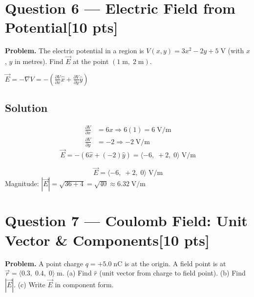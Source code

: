 \documentclass[12pt,letterpaper]{article}
\newcommand{\bvec}[1]{\langle #1 \rangle}   %
\newcommand{\units}[1]{\;\text{#1}}
\newcommand{\pts}[1]{\hfill\textcolor{TorontoBlue60}{[#1 pts]}}
\begin{document}
\newpage

\section{Question 6 --- Electric Field from Potential\pts{10}}
\label{sec:q6}

\textbf{Problem.} The electric potential in a region is
$V(x,y) = 3x^2 - 2y + 5\units{V}$ (with $x$, $y$ in metres).
Find $\vec{E}$ at the point $(1\units{m},\;2\units{m})$.

\begin{tcolorbox}[principbox]
$\vec{E} = -\nabla V = -\left(\frac{\partial V}{\partial x}\hat{x}
                              + \frac{\partial V}{\partial y}\hat{y}\right)$
\end{tcolorbox}

\subsection*{Solution}

\begin{align*}
  \frac{\partial V}{\partial x} &= 6x \Rightarrow 6(1) = 6\units{V/m} \\
  \frac{\partial V}{\partial y} &= -2  \Rightarrow -2\units{V/m}
\end{align*}
\[
  \vec{E} = -(6\hat{x} + (-2)\hat{y}) = \bvec{-6,\;+2,\;0}\units{V/m}
\]

\begin{tcolorbox}[answerbox]
\[
  \boxed{\vec{E} = \bvec{-6,\;+2,\;0}\units{V/m}}
\]
Magnitude: $|\vec{E}| = \sqrt{36+4} = \sqrt{40} \approx 6.32\units{V/m}$
\end{tcolorbox}

\newpage

\section{Question 7 --- Coulomb Field: Unit Vector \& Components\pts{10}}
\label{sec:q7}

\textbf{Problem.} A point charge $q = +5.0\units{nC}$ is at the origin. A field
point is at $\vec{r} = \bvec{0.3,\;0.4,\;0}\units{m}$.
(a) Find $\hat{r}$ (unit vector from charge to field point).
(b) Find $|\vec{E}|$.
(c) Write $\vec{E}$ in component form.
\end{document}

